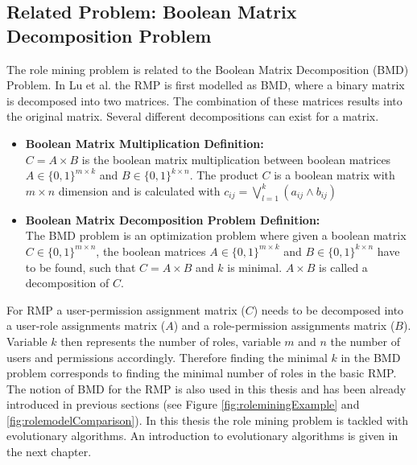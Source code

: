     \subsection{Related Problem: Boolean Matrix Decomposition Problem}
    The role mining problem is related to the Boolean Matrix Decomposition (BMD) Problem. In Lu et al.\cite{4497438} the RMP is first modelled as BMD, where a binary matrix is decomposed into two matrices. The combination of these matrices results into the original matrix. Several different decompositions can exist for a matrix.
    \begin{itemize}
    \item \textbf{Boolean Matrix Multiplication Definition:}\\
    $C = A \times B$ is the boolean matrix multiplication between boolean matrices $A \in \{0,1\}^{m \times k}$ and $B \in \{0,1\}^{k \times n}$. The product $C$ is a boolean matrix with $m \times n$ dimension and is calculated with $c_{ij} = \bigvee_{l=1}^{k}(a_{ij} \wedge b_{ij})$
     \item \textbf{Boolean Matrix Decomposition Problem Definition:}\\
    The BMD problem is an optimization problem where given a boolean matrix $C \in \{0,1\}^{m \times n}$, the boolean matrices $A \in \{0,1\}^{m \times k}$ and $B \in \{0,1\}^{k \times n}$ have to be found, such that $C = A \times B$ and $k$ is minimal\cite{vaidya2012boolean}. $A \times B$ is called a decomposition of $C$.
    \end{itemize}
    For RMP a user-permission assignment matrix ($C$) needs to be decomposed into a user-role assignments matrix ($A$) and a role-permission assignments matrix ($B$). Variable $k$ then represents the number of roles, variable $m$ and $n$ the number of users and permissions accordingly. Therefore finding the minimal $k$ in the BMD problem corresponds to finding the minimal number of roles in the basic RMP. The notion of BMD for the RMP is also used in this thesis and has been already introduced in previous sections (see Figure \ref{fig:roleminingExample} and \ref{fig:rolemodelComparison}).
\newline
\newline
In this thesis the role mining problem is tackled with evolutionary algorithms. An introduction to evolutionary algorithms is given in the next chapter.